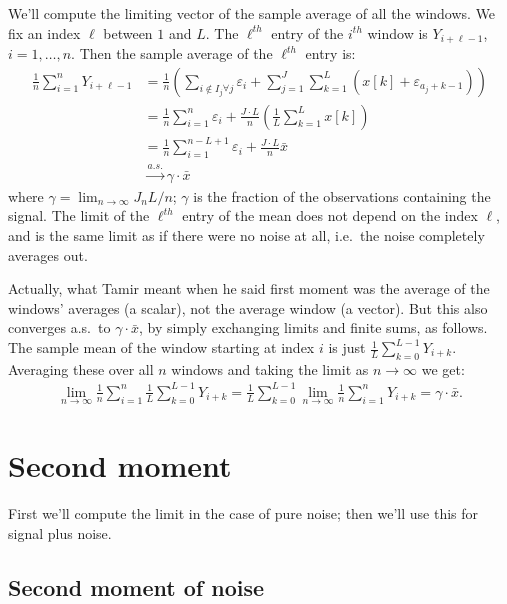 \documentclass{article}
\theoremstyle{thm}
\theoremstyle{definition}
\newcommand{\ep}{\varepsilon}
\begin{document}
We'll compute the limiting vector of the sample average of all the windows. We fix an index $\ell$ between $1$ and $L$. The $\ell^{th}$ entry of the $i^{th}$ window is $Y_{i+\ell-1}$, $i=1,\dots,n$. Then the sample average of the $\ell^{th}$ entry is:
%
\begin{align}
%
    \frac{1}{n} \sum_{i=1}^n Y_{i+\ell - 1} &=
    \frac{1}{n}  \left( \sum_{i \notin I_j \forall j} \ep_i 
                  + \sum_{j=1}^J \sum_{k=1}^L (x[k] + \ep_{a_j + k-1} ) \right) 
    \nonumber \\
%
        &= \frac{1}{n}\sum_{i=1}^{n} \ep_i 
                  + \frac{J \cdot L}{n} \left(\frac{1}{L} \sum_{k=1}^L x[k]\right) 
    \nonumber \\
        &= \frac{1}{n}\sum_{i=1}^{n-L+1} \ep_i 
                  + \frac{J \cdot L}{n} \bar{x}       
     \nonumber \\
%
        &\operatorname*{\longrightarrow}^{a.s.}  \gamma  \cdot \bar{x}
%
\end{align}
%
where $\gamma = \lim_{n\to\infty} J_n L / n$; $\gamma$ is the fraction of the observations containing the signal. The limit of the $\ell^{th}$ entry of the mean does not depend on the index $\ell$, and is the same limit as if there were no noise at all, i.e.\ the noise completely averages out.

Actually, what Tamir meant when he said first moment was the average of the windows' averages (a scalar), not the average window (a vector). But this also converges a.s.\ to $\gamma \cdot \bar{x}$, by simply exchanging limits and finite sums, as follows. The sample mean of the window starting at index $i$ is just $\frac{1}{L} \sum_{k=0}^{L-1} Y_{i+k}$. Averaging these over all $n$ windows and taking the limit as $n \to \infty$ we get:
%
\begin{align}
%
    \lim_{n\to\infty} \frac{1}{n} \sum_{i=1}^n \frac{1}{L} \sum_{k=0}^{L-1} Y_{i+k}
    =  \frac{1}{L} \sum_{k=0}^{L-1} \lim_{n\to\infty} \frac{1}{n} \sum_{i=1}^n Y_{i+k}
    = \gamma \cdot \bar{x}.
%
\end{align}



\section{Second moment}

First we'll compute the limit in the case of pure noise; then we'll use this for signal plus noise.


\subsection{Second moment of noise}
\end{document}
